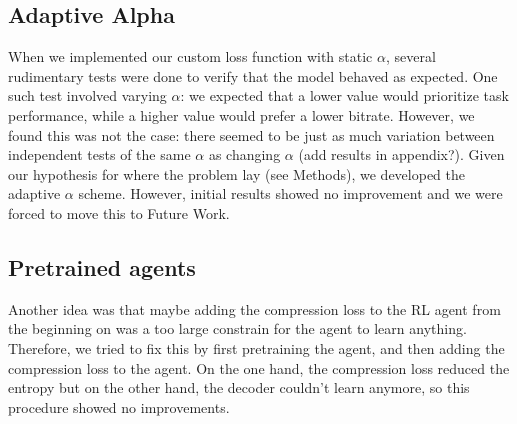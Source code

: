 \subsection{Adaptive Alpha}
When we implemented our custom loss function with static $\alpha$, several
rudimentary tests were done to verify that the model behaved as expected. One
such test involved varying $\alpha$: we expected that a lower value would
prioritize task performance, while a higher value would prefer a lower bitrate.
However, we found this was not the case: there seemed to be just as much
variation between independent tests of the same $\alpha$ as changing $\alpha$
(add results in appendix?). Given our hypothesis for where the problem lay (see
Methods), we developed the adaptive $\alpha$ scheme. However, initial results
showed no improvement and we were forced to move this to Future Work.

\subsection{Pretrained agents}
Another idea was that maybe adding the compression loss to the RL agent from the
beginning on was a too large constrain for the agent to learn anything.
Therefore, we tried to fix this by first pretraining the agent, and then adding
the compression loss to the agent. On the one hand, the compression loss reduced
the entropy but on the other hand, the decoder couldn't learn anymore, so this
procedure showed no improvements.







